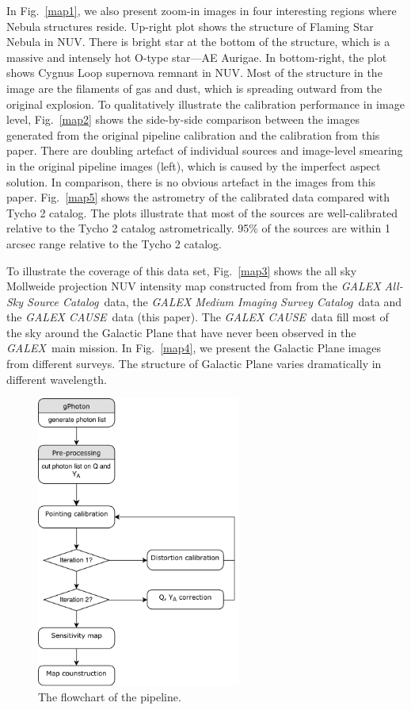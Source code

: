 \documentclass[12pt, preprint]{aastex61}
\newcommand{\project}[1]{\textsl{#1}}
\newcommand{\galex}{\project{GALEX}}
\newcommand{\asc}{\project{GALEX All-Sky Source Catalog}}
\newcommand{\msc}{\project{GALEX Medium Imaging Survey Catalog}}
\newcommand{\cause}{\project{GALEX CAUSE}}
\begin{document}
In Fig.~\ref{map1}, we also present zoom-in images in four interesting regions where Nebula structures reside.
Up-right plot shows the structure of Flaming Star Nebula in NUV. There is bright star at the bottom of the structure, which is a massive and intensely hot O-type star---AE Aurigae.
In bottom-right, the plot shows Cygnus Loop supernova remnant in NUV. Most of the structure in the image are the filaments of gas and dust, which is spreading outward from the original explosion.
To qualitatively illustrate the calibration performance in image level, Fig.~\ref{map2} shows the side-by-side comparison between the images generated from the original pipeline calibration and the calibration from this paper.
There are doubling artefact of individual sources and image-level smearing in the original pipeline images (left), which is caused by the imperfect aspect solution.
In comparison, there is no obvious artefact in the images from this paper.
Fig.~\ref{map5} shows the astrometry of the calibrated data compared with Tycho 2 catalog.
The plots illustrate that most of the sources are well-calibrated relative to the Tycho 2 catalog astrometrically.
95\% of the sources are within 1 arcsec range relative to the Tycho 2 catalog.

To illustrate the coverage of this data set, Fig.~\ref{map3} shows the all sky Mollweide projection NUV intensity map constructed from from the \asc\ data, the \msc\ data and the \cause\ data (this paper).
The \cause\ data fill most of the sky around the Galactic Plane that have never been observed in the \galex\ main mission.
In Fig.~\ref{map4}, we present the Galactic Plane images from different surveys. 
The structure of Galactic Plane varies dramatically in different wavelength.
\begin{figure}[p]
\begin{center}
\includegraphics[width=0.6\textwidth]{figures/flowchart}
\end{center}
\caption{
  \label{flowchart}
  The flowchart of the pipeline.
}
\end{figure}
\end{document}
